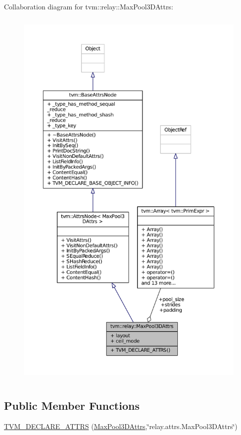 Collaboration diagram for tvm\+:\+:relay\+:\+:Max\+Pool3\+D\+Attrs\+:
\nopagebreak
\begin{figure}[H]
\begin{center}
\leavevmode
\includegraphics[height=550pt]{structtvm_1_1relay_1_1MaxPool3DAttrs__coll__graph}
\end{center}
\end{figure}
\subsection*{Public Member Functions}
\begin{DoxyCompactItemize}
\item 
\hyperlink{structtvm_1_1relay_1_1MaxPool3DAttrs_a41ee9b7163a822d41c777ba9e649b485}{T\+V\+M\+\_\+\+D\+E\+C\+L\+A\+R\+E\+\_\+\+A\+T\+T\+RS} (\hyperlink{structtvm_1_1relay_1_1MaxPool3DAttrs}{Max\+Pool3\+D\+Attrs},\char`\"{}relay.\+attrs.\+Max\+Pool3\+D\+Attrs\char`\"{})
\end{DoxyCompactItemize}
